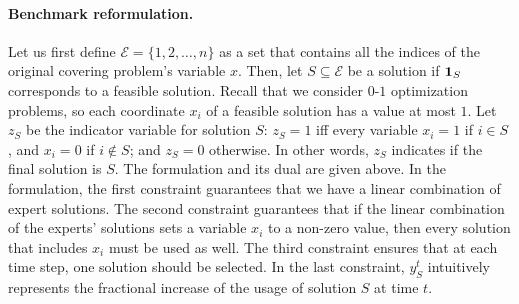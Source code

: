 \paragraph{Benchmark reformulation.} Let us first define $\mathcal{E} = \{1,2,\dots,n\}$ as a set that contains all the indices of the original covering problem's variable $x$. Then, let $S \subseteq \mathcal{E}$ be a solution if $\mathbf{1}_{S}$ corresponds to a feasible solution. Recall that we consider $0$-$1$ optimization problems, so each coordinate $x_i$ of a feasible solution has a value at most $1$. Let $z_{S}$ be the indicator variable for solution $S$: $z_{S} = 1$ iff every variable $x_{i} = 1$ if $i \in S$, and $x_{i} = 0$ if $i \notin S$; and $z_S = 0$ otherwise. In other words, $z_{S}$ indicates if the final solution is $S$. The formulation and its dual are given above. In the formulation,
the first constraint guarantees that we have a linear combination of expert solutions.
The second constraint guarantees that if the linear combination of the experts' solutions sets a variable $x_i$ to a non-zero value, then every solution that includes $x_i$ must be used as well. The third constraint ensures that at each time step, one solution should be selected. In the last constraint,
$y_S^{t}$ intuitively represents the fractional increase of the usage of solution $S$ at time $t$.




